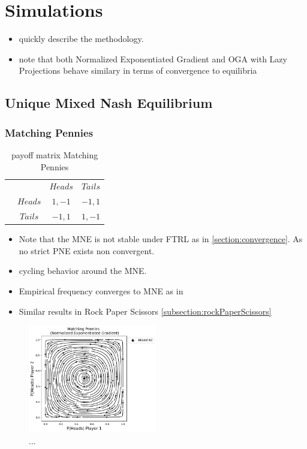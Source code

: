 
\chapter{Simulations}\label{chapter:simulations}

\begin{itemize}
    \item quickly describe the methodology.
    \item note that both Normalized Exponentiated Gradient and OGA with Lazy Projections behave similary in terms of convergence to equilibria
\end{itemize}

\section{Unique Mixed Nash Equilibrium}\label{section:uniqueMixedNashEquilibrium}

\subsection{Matching Pennies}\label{subsection:machtingPennies}

\begin{table}\centering
\setlength{\extrarowheight}{2pt}
\begin{tabular}{cc|c|c|}
  & \multicolumn{1}{c}{} & \multicolumn{1}{c}{$Heads$}  & \multicolumn{1}{c}{$Tails$} \\\cline{3-4}
  & $Heads$ & $1,-1$ & $-1,1$ \\\cline{3-4}
  & $Tails$ & $-1,1$ & $1,-1$ \\\cline{3-4}
\end{tabular}\caption{\label{tab:payoffMachtingPennies}payoff matrix Matching Pennies}
\end{table}

\begin{itemize}
    \item Note that the MNE is not stable under FTRL as in \ref{section:convergence}. As no strict PNE exists non convergent.
    \item cycling behavior around the MNE.
    \item Empirical frequency converges to MNE as in \cite{jafari}
    \item Similar results in Rock Paper Scissors \ref{subsection:rockPaperScissors}
\end{itemize}

\begin{figure}
    \centering
    \includegraphics[width=0.5\textwidth]{logos/Pennies1.png}
    \caption{...}
    \label{Pennies1}
\end{figure}

